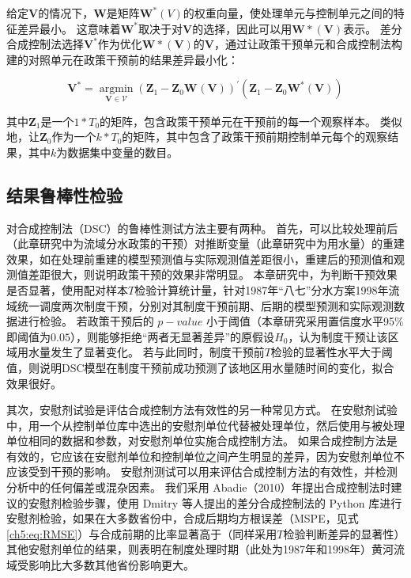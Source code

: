 给定$\mathbf{V}$的情况下，$\mathbf{W}$是矩阵$\mathbf{W}^{*}(V)$的权重向量，使处理单元与控制单元之间的特征差异最小。
这意味着$\mathbf{W^{*}}$取决于对$\mathbf{V}$的选择，因此可以用$\mathbf{W*(V)}$表示。
差分合成控制法选择$\mathbf{V^{*}}$作为优化$\mathbf{W*(V)}$的$\mathbf{V}$，通过让政策干预单元和合成控制法构建的对照单元在政策干预前的结果差异最小化：

\begin{equation}
    \mathbf{V}^{*}=\underset{\mathbf{V} \in \mathcal{V}}{\operatorname{argmin}}{\left(\mathbf{Z}_{1}-\mathbf{Z}_{0} \mathbf{W}^{}(\mathbf{V})\right)}^{\prime}{\left(\mathbf{Z}_{1}-\mathbf{Z}_{0} \mathbf{W}^{*}(\mathbf{V})\right)}
\end{equation}

其中$\mathbf{Z}_{1}$是一个$1*T_0$的矩阵，包含政策干预单元在干预前的每一个观察样本。
类似地，让$\mathbf{Z}_{0}$作为一个$k * T_0$的矩阵，其中包含了政策干预前期控制单元每个的观察结果，其中$k$为数据集中变量的数目。

\subsection{结果鲁棒性检验}

对合成控制法（DSC）的鲁棒性测试方法主要有两种。
首先，可以比较处理前后（此章研究中为流域分水政策的干预）对推断变量（此章研究中为用水量）的重建效果，如在处理前重建的模型预测值与实际观测值差距很小，重建后的预测值和观测值差距很大，则说明政策干预的效果非常明显。
本章研究中，为判断干预效果是否显著，使用配对样本$T$检验计算统计量，针对1987年“八七”分水方案1998年流域统一调度两次制度干预，分别对其制度干预前期、后期的模型预测和实际观测数据进行检验。
若政策干预后的 $p-value$ 小于阈值（本章研究采用置信度水平95\%即阈值为$0.05$），则能够拒绝“两者无显著差异”的原假设$H_0$，认为制度干预让该区域用水量发生了显著变化。
若与此同时，制度干预前$T$检验的显著性水平大于阈值，则说明DSC模型在制度干预前成功预测了该地区用水量随时间的变化，拟合效果很好。

其次，安慰剂试验是评估合成控制方法有效性的另一种常见方式。
在安慰剂试验中，用一个从控制单位库中选出的安慰剂单位代替被处理单位，然后使用与被处理单位相同的数据和参数，对安慰剂单位实施合成控制方法。
如果合成控制方法是有效的，它应该在安慰剂单位和控制单位之间产生明显的差异，因为安慰剂单位不应该受到干预的影响。
安慰剂测试可以用来评估合成控制方法的有效性，并检测分析中的任何偏差或混杂因素。
我们采用 Abadie（2010）年提出合成控制法时建议的安慰剂检验步骤\cite{abadie2010}，使用 Dmitry 等人提出的差分合成控制法的 Python 库进行安慰剂检验，如果在大多数省份中，合成后期均方根误差（MSPE，见式\ref{ch5:eq:RMSE}）与合成前期的比率显著高于（同样采用$T$检验判断差异的显著性）其他安慰剂单位的结果，则表明在制度处理时期（此处为1987年和1998年）黄河流域受影响比大多数其他省份影响更大。

